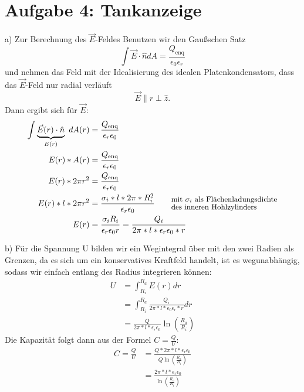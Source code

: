 \documentclass[11pt a4paper]{article}
\newcommand{\epsz}{\epsilon_0}
\begin{document}
\newpage
\section*{Aufgabe 4: Tankanzeige}
\par{a)}
Zur Berechnung des $\vec E$-Feldes Benutzen wir den Gaußschen Satz
\[ \int \vec E \cdot \hat n dA = \frac{Q_\text{enq}}{\epsz\epsilon_r} \]
und nehmen das Feld mit der Idealisierung des idealen Platenkondensators,
dass das $\vec E$-Feld nur radial verläuft
\[ \vec E \parallel \hat r \perp \hat z. \]
Dann ergibt sich für $\vec E$:
\begin{align*}
	\int \underbrace{\vec E(r) \cdot \hat n}_{E(r)}	\ dA(r) 
	&= \frac{Q_\text{enq}}{\epsilon_r \epsz} \\
	E(r) * A(r) &= \frac{Q_\text{enq}}{\epsilon_r \epsz} \\
	E(r) * 2\pi r^2 &= \frac{Q_\text{enq}}{\epsilon_r \epsz} \\
	E(r) * l * 2\pi r^2 &= \frac{\sigma_i * l * 2\pi * R_i^2}
	{\epsilon_r \epsz}
	\qquad ^{\text{\small mit $\sigma_i$ als Flächenladungsdichte}}
	_{\text{\small des inneren Hohlzylinders}} \\
	E(r) &= \frac{\sigma_i R_i}{\epsilon_r \epsz r} 
	= \frac{Q_i}{2\pi * l * \epsilon_r \epsz * r}
\end{align*}

\vspace{0.5cm}
\par{b)}
Für die Spannung U bilden wir ein Wegintegral über mit den zwei Radien als 
Grenzen, da es sich um ein konservatives Kraftfeld handelt, ist es 
wegunabhängig, sodass wir einfach entlang des Radius integrieren können:
\begin{align*}
	U &= \int_{R_i}^{R_a} E(r) dr \\
	&= \int_{R_i}^{R_a} \frac{Q_i}{2\pi * l * \epsz \epsilon_r* r} dr \\
	&= \frac{Q}{2\pi * l * \epsilon_r \epsz} \ln\left(\frac{R_a}{R_i}
	\right)
\end{align*}
Die Kapazität folgt dann aus der Formel $C = \frac QU$:
\begin{align*}
	C = \frac QU &= \frac{Q * 2\pi * l * \epsilon_r \epsz}
	{Q \ln\left(\frac{R_a}{R_i}\right)} \\
	&= \frac{2\pi * l * \epsilon_r \epsz}
	{\ln\left(\frac{R_a}{R_i}\right)} 
\end{align*}
\end{document}
